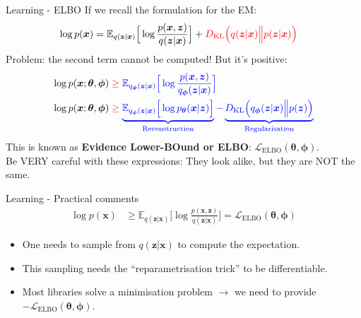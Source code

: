 \documentclass[11pt,aspectratio=169,usenames,dvipsnames]{beamer}
\newcommand{\bs}{\boldsymbol}
\begin{document}
\begin{frame}{Learning - ELBO}
 If we recall the formulation for the EM:
 \begin{align*}
\log p(\bs{x}) &= \mathbb{E}_{q(\bs{z}|\bs{x})}\Big[\log \frac{p(\bs{x},\bs{z})}{q(\bs{z}|\bs{x})}\Big] + {\color{red} D_{\text{KL}}\Big(q(\bs{z}|\bs{x})\Big\lVert p(\bs{z}|\bs{x})\Big)}
\end{align*}\pause
Problem: the second term cannot be computed! But it's positive:
 \begin{align*}
\log p(\bs{x};\bs{\theta},\bs{\phi}) &\; {\color{red}\geq}\; {\color{blue} \mathbb{E}_{q_{\bs{\phi}}(\bs{z}|\bs{x})}\Big[\log \frac{p(\bs{x},\bs{z})}{q_{\bs{\phi}}(\bs{z}|\bs{x})}\Big]} \\
\log p(\bs{x};\bs{\theta},\bs{\phi}) &\; {\color{red}\geq}\; {\color{blue} \underbrace{\mathbb{E}_{q_{\bs{\phi}}(\bs{z}|\bs{x})}\Big[\log p_{\bs{\theta}}(\bs{x}|\bs{z})\Big]}_{\text{Reconstruction}} -  \underbrace{D_{\text{KL}}\Big(q_{\bs{\phi}}(\bs{z}|\bs{x})\Big\lVert p(\bs{z})\Big)}_{\text{Regularisation}}}
\end{align*}
This is known as \textbf{Evidence Lower-BOund or ELBO}: $\mathcal{L}_{\text{ELBO}}(\bs{\theta},\bs{\phi})$.\vspace{3mm}\\
Be VERY careful with these expressions: They look alike, but they are NOT the same.
\end{frame}

\begin{frame}{Learning - Practical comments}
\begin{align*}
\log p(\bs{x}) &\geq \mathbb{E}_{q(\bs{z}|\bs{x})}\Big[\log \frac{p(\bs{x},\bs{z})}{q(\bs{z}|\bs{x})}\Big] = \mathcal{L}_{\text{ELBO}}(\bs{\theta},\bs{\phi})
\end{align*}

\begin{itemize}
\item One needs to sample from $q(\bs{z}|\bs{x})$ to compute the expectation.
\item This sampling needs the ``reparametrisation trick'' to be differentiable.
\item Most libraries solve a minimisation problem $\rightarrow$ we need to provide $-\mathcal{L}_{\text{ELBO}}(\bs{\theta},\bs{\phi})$.
\end{itemize}

\end{frame}
\end{document}
